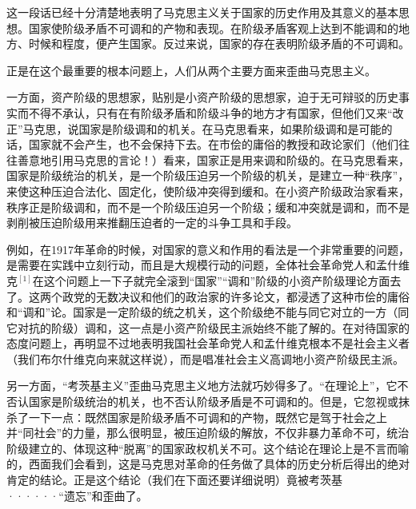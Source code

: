 \leftskip=0mm
\normalsize
\pskip
这一段话已经十分清楚地表明了马克思主义关于国家的历史作用及其意义的基本思想。国家使阶级矛盾{\kaishu 不可调和}的产物和表现。在阶级矛盾客观上达到{\kaishu 不能调和}的地方、时候和程度，便产生国家。反过来说，国家的存在表明阶级矛盾的不可调和。

正是在这个最重要的根本问题上，人们从两个主要方面来歪曲马克思主义。

一方面，资产阶级的思想家，贴别是小资产阶级的思想家，迫于无可辩驳的历史事实而不得不承认，只有在有阶级矛盾和阶级斗争的地方才有国家，但他们又来“改正”马克思，说国家是阶级{\kaishu 调和}的机关。在马克思看来，如果阶级调和是可能的话，国家就不会产生，也不会保持下去。在市侩的庸俗的教授和政论家们（他们往往善意地引用马克思的言论！）看来，国家正是用来调和阶级的。在马克思看来，国家是阶级{\kaishu 统治}的机关，是一个阶级{\kaishu 压迫}另一个阶级的机关，是建立一种“秩序”，来使这种压迫合法化、固定化，使阶级冲突得到缓和。在小资产阶级政治家看来，秩序正是阶级调和，而不是一个阶级压迫另一个阶级；缓和冲突就是调和，而不是剥削被压迫阶级用来推翻压迫者的一定的斗争工具和手段。

例如，在1917年革命的时候，对国家的意义和作用的看法是一个非常重要的问题，是需要在实践中立刻行动，而且是大规模行动的问题，全体社会革命党人和孟什维克$^{[1]}$在这个问题上一下子就完全滚到“国家”“调和”阶级的小资产阶级理论方面去了。这两个政党的无数决议和他们的政治家的许多论文，都浸透了这种市侩的庸俗和“调和”论。国家是一定阶级的统之机关，这个阶级{\kaishu 绝不能}与同它对立的一方（同它对抗的阶级）调和，这一点是小资产阶级民主派始终不能了解的。在对待国家的态度问题上，再明显不过地表明我国社会革命党人和孟什维克根本不是社会主义者（我们布尔什维克向来就这样说），而是唱准社会主义高调地小资产阶级民主派。

另一方面，“考茨基主义”歪曲马克思主义地方法就巧妙得多了。“在理论上”，它不否认国家是阶级统治的机关，也不否认阶级矛盾是不可调和的。但是，它忽视或抹杀了一下一点：既然国家是阶级矛盾不可调和的产物，既然它是驾于社会之上并“同社会”的力量，那么很明显，被压迫阶级的解放，不仅非暴力革命不可，统治阶级建立的、体现这种“脱离”的国家政权机关不可。这个结论在理论上是不言而喻的，西面我们会看到，这是马克思对革命的任务做了具体的历史分析后得出的绝对肯定的结论。正是这个结论（我们在下面还要详细说明）竟被考茨基······“遗忘”和歪曲了。




